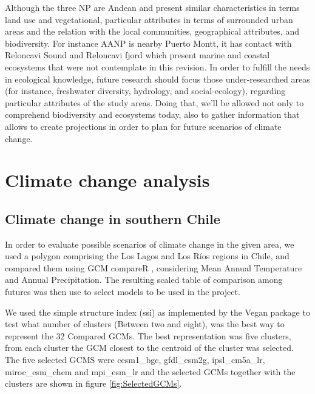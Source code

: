 \documentclass[]{article}
\begin{document}
Although the three NP are Andean and present similar characteristics in terms land use and vegetational, particular attributes in terms of surrounded urban areas and the relation with the local communities, geographical attributes, and biodiversity.
For instance AANP is nearby Puerto Montt, it has contact with Reloncavi Sound and Reloncavi fjord which present marine and coastal ecosystems that were not contemplate in this revision.
In order to fulfill the needs in ecological knowledge, future research should focus those under-researched areas (for instance, freshwater diversity, hydrology, and social-ecology), regarding particular attributes of the study areas.
Doing that, we'll be allowed not only to comprehend biodiversity and ecosystems today, also to gather information that allows to create projections in order to plan for future scenarios of climate change.

\hypertarget{climate-change-analysis}{%
\section{Climate change analysis}\label{climate-change-analysis}}

\hypertarget{climate-change-in-southern-chile}{%
\subsection{Climate change in southern Chile}\label{climate-change-in-southern-chile}}

In order to evaluate possible scenarios of climate change in the given area, we used a polygon comprising the Los Lagos and Los Ríos regions in Chile, and compared them using GCM compareR \citep{fajardo2020gcm}, considering Mean Annual Temperature and Annual Precipitation. The resulting scaled table of comparison among futures was then use to select models to be used in the project.

We used the simple structure index (ssi) as implemented by the Vegan package \citep{Oksanen_2019, dolnicar1999tale} to test what number of clusters (Between two and eight), was the best way to represent the 32 Compared GCMs. The best representation was five clusters, from each cluster the GCM closest to the centroid of the cluster was selected. The five selected GCMS were cesm1\_bgc, gfdl\_esm2g, ipsl\_cm5a\_lr, miroc\_esm\_chem and mpi\_esm\_lr and the selected GCMs together with the clusters are shown in figure \ref{fig:SelectedGCMs}.
\end{document}
